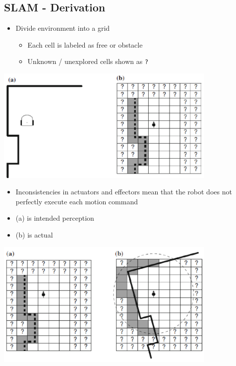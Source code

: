\documentclass[10pt]{article}
\begin{document}
\subsection*{SLAM - Derivation}
\begin{itemize}
	\item Divide environment into a grid
	\begin{itemize}
        \item Each cell is labeled as free or obstacle
        \item Unknown / unexplored cells shown as \texttt{?}
    \end{itemize}
\end{itemize}
\begin{center} 
	\includegraphics*[width=0.8\textwidth]{L2_6.png} 
\end{center}

\begin{itemize}
	\item Inconsistencies in actuators and effectors mean that the robot does not perfectly execute each motion command
	\item (a) is intended perception
	\item (b) is actual
\end{itemize}
\begin{center} 
	\includegraphics*[width=0.8\textwidth]{L2_7.png} 
\end{center}
\end{document}
